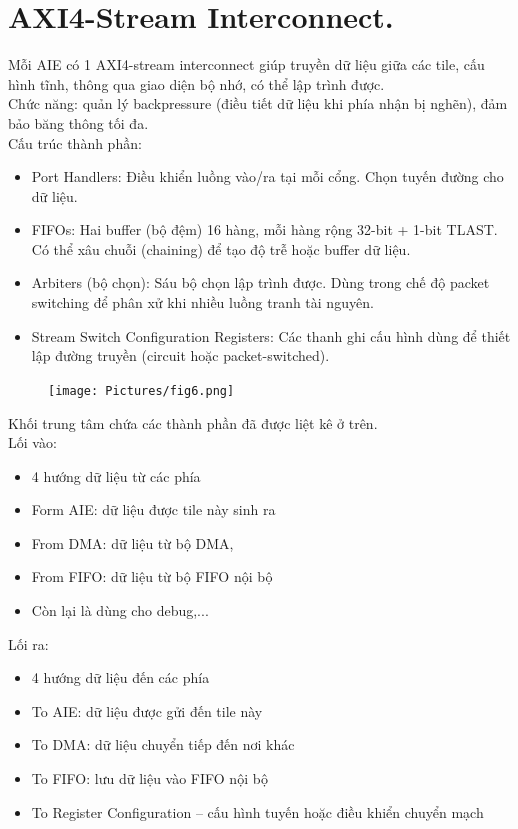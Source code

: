 \section{AXI4-Stream Interconnect\cite{amdAM009}.} 

 Mỗi AIE có 1 AXI4-stream interconnect giúp truyền dữ liệu giữa các tile, cấu hình tĩnh, thông qua giao diện bộ nhớ, có thể lập trình được.\\
 Chức năng: quản lý backpressure (điều tiết dữ liệu khi phía nhận bị nghẽn), đảm bảo băng thông tối đa.\\
 Cấu trúc thành phần:
\begin{itemize}
    \item Port Handlers:
    Điều khiển luồng vào/ra tại mỗi cổng.
    Chọn tuyến đường cho dữ liệu.
    \item FIFOs:
    Hai buffer (bộ đệm) 16 hàng, mỗi hàng rộng 32-bit + 1-bit TLAST.
    Có thể xâu chuỗi (chaining) để tạo độ trễ hoặc buffer dữ liệu.
    \item Arbiters (bộ chọn):
    Sáu bộ chọn lập trình được. 
    Dùng trong chế độ packet switching để phân xử khi nhiều luồng tranh tài nguyên.
    \item Stream Switch Configuration Registers:
    Các thanh ghi cấu hình dùng để thiết lập đường truyền (circuit hoặc packet-switched).
\end{itemize}
\begin{figure}[H]
    \centering
    \texttt{[image: Pictures/fig6.png]}
    
    \label{fig:enter-label}
\end{figure}
Khối trung tâm chứa các thành phần đã được liệt kê ở trên.\\
Lối vào: 
\begin{itemize}
    \item 4 hướng dữ liệu từ các phía
    \item Form AIE: dữ liệu được tile này sinh ra
    \item From DMA: dữ liệu từ bộ DMA, 
    \item From FIFO: dữ liệu từ bộ FIFO nội bộ
    \item Còn lại là dùng cho debug,...
\end{itemize}
Lối ra: 
\begin{itemize}
    \item 4 hướng dữ liệu đến các phía
    \item To AIE: dữ liệu được gửi đến tile này
    \item To DMA: dữ liệu chuyển tiếp đến nơi khác 
    \item To FIFO: lưu dữ liệu vào FIFO nội bộ
    \item To Register Configuration – cấu hình tuyến hoặc điều khiển chuyển mạch
\end{itemize}

